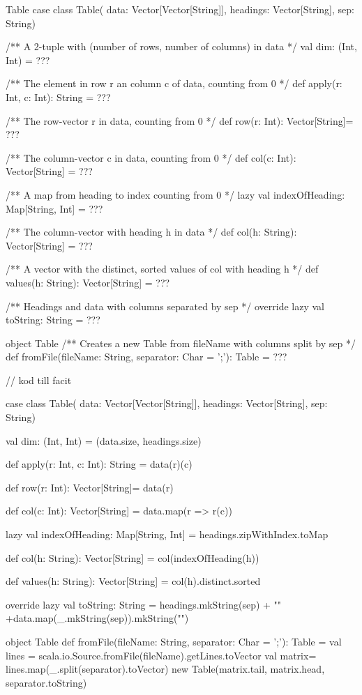 \begin{ScalaSpec}{Table}
case class Table(
  data: Vector[Vector[String]], 
  headings: Vector[String], 
  sep: String){
  /** A 2-tuple with (number of rows, number of columns) in data */
  val dim: (Int, Int) = ???

  /** The element in row r an column c of data, counting from 0 */
  def apply(r: Int, c: Int): String = ???

  /** The row-vector r in data, counting from 0 */
  def row(r: Int): Vector[String]= ???

  /** The column-vector c in data, counting from 0 */
  def col(c: Int): Vector[String] = ???

  /** A map from heading to index counting from 0 */
  lazy val indexOfHeading: Map[String, Int] = ???

  /** The column-vector with heading h in data */
  def col(h: String): Vector[String] = ???

  /** A vector with the distinct, sorted values of col with heading h */ 
  def values(h: String): Vector[String] = ???

  /** Headings and data with columns separated by sep */
  override lazy val toString: String = ???
}
object Table {
  /** Creates a new Table from fileName with columns split by sep */
  def fromFile(fileName: String, separator: Char = ';'): Table = ???
}
\end{ScalaSpec}


\begin{CodeSmall}
// kod till facit

case class Table(
  data: Vector[Vector[String]], 
  headings: Vector[String], 
  sep: String){

  val dim: (Int, Int) = (data.size, headings.size)

  def apply(r: Int, c: Int): String = data(r)(c)

  def row(r: Int): Vector[String]= data(r)

  def col(c: Int): Vector[String] = data.map(r => r(c))

  lazy val indexOfHeading: Map[String, Int] = headings.zipWithIndex.toMap

  def col(h: String): Vector[String] = col(indexOfHeading(h)) 

  def values(h: String): Vector[String] = col(h).distinct.sorted

  override lazy val toString: String = 
    headings.mkString(sep) + "\n" +data.map(_.mkString(sep)).mkString("\n")
}
object Table {
  def fromFile(fileName: String, separator: Char = ';'): Table = {
    val lines = scala.io.Source.fromFile(fileName).getLines.toVector
    val matrix= lines.map(_.split(separator).toVector) 
    new Table(matrix.tail, matrix.head, separator.toString)
  }
}
\end{CodeSmall}

